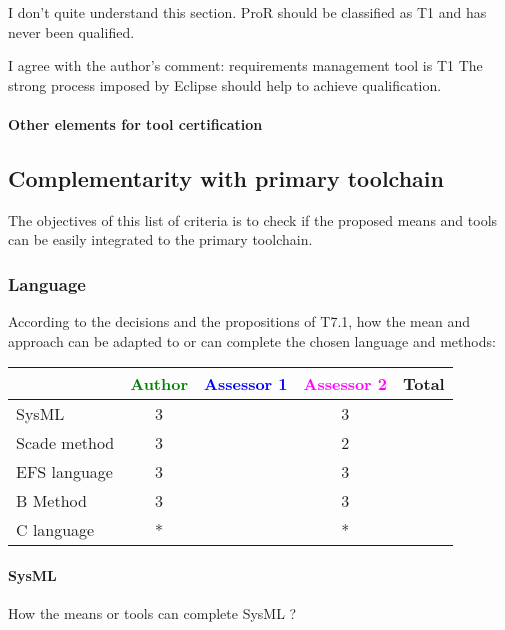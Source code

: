 \begin{author_comment}
I don't quite understand this section.  ProR should be classified as T1 and has never been qualified.
\end{author_comment}

\begin{assessor2}
I agree with the author's comment: requirements management tool is T1 The strong process imposed by Eclipse should help to achieve qualification.
\end{assessor2}

\paragraph{Other elements for tool certification}


\subsection{Complementarity with primary toolchain}

The objectives of this list of criteria is to check if the proposed means and tools can be easily integrated to the primary toolchain.

\subsubsection{Language}


According to the decisions and the propositions of T7.1, how the mean and approach can be adapted to or can complete the chosen language and methods:

\begin{tabular}{|l | c | c | c | c|}
\hline
& \textcolor{green}{Author} & \textcolor{blue}{Assessor 1} & \textcolor{magenta}{Assessor 2} & Total \\
\hline
SysML  & 3 & & 3 & \\
\hline
Scade method & 3 & & 2 & \\
\hline
EFS language & 3 & & 3 & \\
\hline
B Method & 3 & & 3 & \\
\hline
C language & * & & * & \\
\hline
\end{tabular}

\paragraph{SysML}
How the means or tools can complete SysML ?

